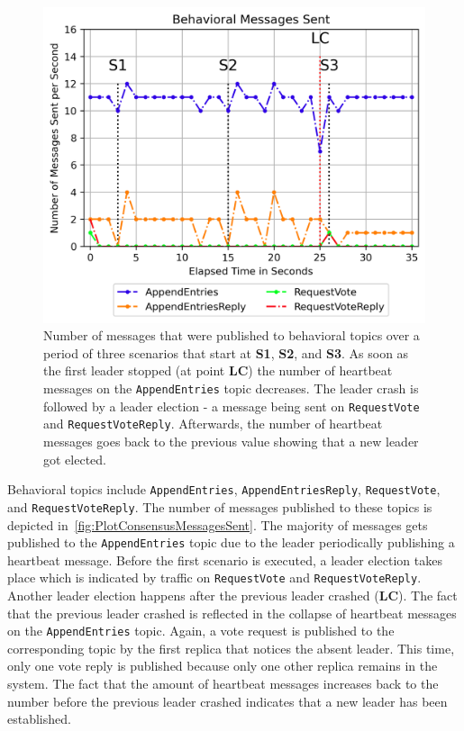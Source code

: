 \begin{figure}[h!]
	\centering
	\includegraphics[width=0.8\linewidth]{images/plots/ConsensusMessagesSent}
	\caption{Number of messages that were published to behavioral topics over a period of three scenarios that start at \textbf{S1}, \textbf{S2}, and \textbf{S3}. As soon as the first leader stopped (at point \textbf{LC}) the number of heartbeat messages on the \texttt{AppendEntries} topic decreases. The leader crash is followed by a leader election - a message being sent on \texttt{RequestVote} and \texttt{RequestVoteReply}. Afterwards, the number of heartbeat messages goes back to the previous value showing that a new leader got elected.}
	\label{fig:PlotConsensusMessagesSent}
\end{figure}

Behavioral topics include \texttt{AppendEntries}, \texttt{AppendEntriesReply}, \texttt{RequestVote}, and \texttt{RequestVoteReply}.
The number of messages published to these topics is depicted in~\autoref{fig:PlotConsensusMessagesSent}.
The majority of messages gets published to the \texttt{AppendEntries} topic due to the leader periodically publishing a heartbeat message.
Before the first scenario is executed, a leader election takes place which is indicated by traffic on \texttt{RequestVote} and \texttt{RequestVoteReply}.
Another leader election happens after the previous leader crashed (\textbf{LC}).
The fact that the previous leader crashed is reflected in the collapse of heartbeat messages on the \texttt{AppendEntries} topic.
Again, a vote request is published to the corresponding topic by the first replica that notices the absent leader.
This time, only one vote reply is published because only one other replica remains in the system.
The fact that the amount of heartbeat messages increases back to the number before the previous leader crashed indicates that a new leader has been established.


